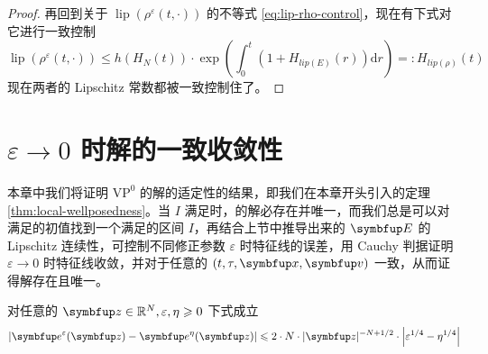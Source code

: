 \begin{proof}
再回到关于 $\operatorname{lip}\left(\rho^{\varepsilon}(t, \cdot)\right) $ 的不等式 \ref{eq:lip-rho-control}，现在有下式对它进行一致控制 
\[
\operatorname{lip}\left(\rho^{\varepsilon}(t, \cdot)\right) \leqslant h\left(H_N(t)\right) \cdot \exp \left(\int_{0}^{t}\left(1+H_{lip(E)}(r)\right) \mathrm{d} r\right)=: H_{lip(\rho)}(t)
\]
现在两者的 Lipschitz 常数都被一致控制住了。


\end{proof}


\section{\texorpdfstring{$\varepsilon \rightarrow 0$}{Lg} 时解的一致收敛性}

本章中我们将证明 $\text{VP}^{0}$ 的解的适定性的结果，即我们在本章开头引入的定理 \ref{thm:local-wellposedness}。当 $I$ 满足\boundcondition 时，\eqvp 的解必存在并唯一，而我们总是可以对满足\supremumf 的初值找到一个满足\boundcondition 的区间 $I$，再结合上节中\lipOffVsphere 推导出来的 $\vE$ 的 Lipschitz 连续性，可控制不同修正参数 $\varepsilon$ 时特征线的误差，用 Cauchy 判据证明 $\varepsilon\rightarrow 0$ 时特征线收敛，并对于任意的 $(t,\tau,\vx,\vv)$ 一致，从而证得解存在且唯一。


\begin{lemma}
    对任意的 $\vect{z} \in \bbR^{N}, \varepsilon, \eta \geqslant 0$ 下式成立
\[
\left|\vect{e}^{\varepsilon}(\vect{z})-\vect{e}^{\eta}(\vect{z})\right| \leqslant 2 \cdot N \cdot|\vect{z}|^{-N+1 / 2} \cdot\left|\varepsilon^{1 / 4}-\eta^{1 / 4}\right|
\]
\end{lemma}

